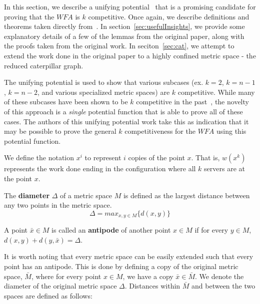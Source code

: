 In this section, we describe a unifying potential~\cite{unifyingPotential2021} that is a promising candidate for proving that the $WFA$ is $k$ competitive. Once again, we describe definitions and theorems taken directly from~\cite{unifyingPotential2021}. In section~\ref{sec:usefulInsights}, we provide some explanatory details of a few of the lemmas from the original paper, along with the proofs taken from the original work. In seciton~\ref{sec:cat}, we attempt to extend the work done in the original paper to a highly confined metric space - the reduced caterpillar graph.

The unifying potential is used to show that various subcases (ex. $k=2$, $k=n-1$, $k=n-2$, and various specialized metric spaces) are $k$ competitive. While many of these subcases have been shown to be $k$ competitive in the past~\cite{server1991, server2009, server1996, server2004, server2002}, the novelty of this approach is a \textit{single} potential function that is able to prove all of these cases. The authors of this unifying potential work take this as indication that it may be possible to prove the general $k$ competitiveness for the $WFA$ using this potential function.

\begin{definition}
    We define the notation $x^i$ to represent $i$ copies of the point $x$. That is, $w(x^k)$ represents the work done ending in the configuration where all $k$ servers are at the point $x$.
\end{definition}

\begin{definition}
    The \textbf{diameter} $\Delta$ of a metric space $M$ is defined as the largest distance between any two points in the metric space.
    \begin{equation*}
        \Delta = max_{x, y \in M} \{ d(x,y)\}
    \end{equation*}
\end{definition}

\begin{definition}
    A point $\bar{x} \in M$ is called an \textbf{antipode} of another point $x \in M$ if for every $y \in M$, $d(x,y) + d(y, \bar{x}) = \Delta$.
\end{definition}

It is worth noting that every metric space can be easily extended such that every point has an antipode. This is done by defining a copy of the original metric space, $\bar{M}$, where for every point $x \in M$, we have a copy $\bar{x} \in \bar{M}$. We denote the diameter of the original metric space $\Delta$. Distances within $\bar{M}$ and between the two spaces are defined as follows:

